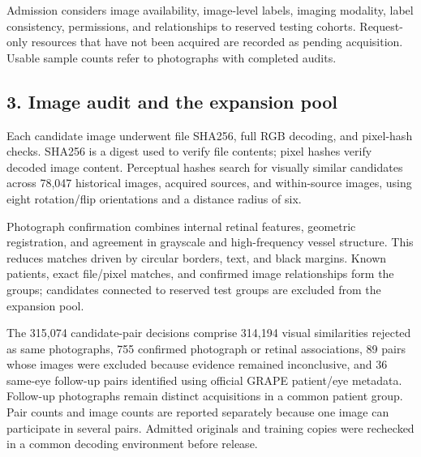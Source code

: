 \documentclass[
  10pt,
]{article}
\begin{document}
Admission considers image availability, image-level labels, imaging
modality, label consistency, permissions, and relationships to reserved
testing cohorts. Request-only resources that have not been acquired are
recorded as pending acquisition. Usable sample counts refer to
photographs with completed audits.

\subsection{3. Image audit and the expansion
pool}\label{image-audit-and-the-expansion-pool}

Each candidate image underwent file SHA256, full RGB decoding, and
pixel-hash checks. SHA256 is a digest used to verify file contents;
pixel hashes verify decoded image content. Perceptual hashes search for
visually similar candidates across 78,047 historical images, acquired
sources, and within-source images, using eight rotation/flip
orientations and a distance radius of six.

Photograph confirmation combines internal retinal features, geometric
registration, and agreement in grayscale and high-frequency vessel
structure. This reduces matches driven by circular borders, text, and
black margins. Known patients, exact file/pixel matches, and confirmed
image relationships form the groups; candidates connected to reserved
test groups are excluded from the expansion pool.

The 315,074 candidate-pair decisions comprise 314,194 visual
similarities rejected as same photographs, 755 confirmed photograph or
retinal associations, 89 pairs whose images were excluded because
evidence remained inconclusive, and 36 same-eye follow-up pairs
identified using official GRAPE patient/eye metadata. Follow-up
photographs remain distinct acquisitions in a common patient group. Pair
counts and image counts are reported separately because one image can
participate in several pairs. Admitted originals and training copies
were rechecked in a common decoding environment before release.
\end{document}
